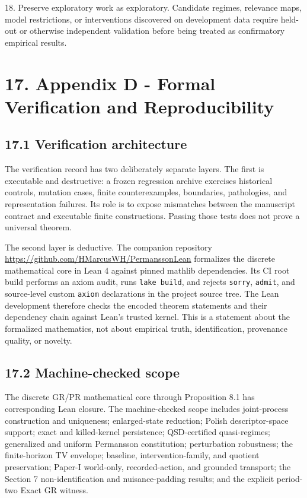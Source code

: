 \documentclass[10pt]{article}
\begin{document}
18. Preserve exploratory work as exploratory. Candidate regimes,
relevance maps, model restrictions, or interventions discovered on
development data require held-out or otherwise independent validation
before being treated as confirmatory empirical results.

\section{17. Appendix D - Formal Verification and Reproducibility}\label{appendix-d-formal-verification}

\subsection{17.1 Verification architecture}\label{verification-architecture}

The verification record has two deliberately separate layers. The first is executable and destructive: a frozen regression archive exercises historical controls, mutation cases, finite counterexamples, boundaries, pathologies, and representation failures. Its role is to expose mismatches between the manuscript contract and executable finite constructions. Passing those tests does not prove a universal theorem.

The second layer is deductive. The companion repository \url{https://github.com/HMarcusWH/PermanssonLean} formalizes the discrete mathematical core in Lean 4 against pinned mathlib dependencies. Its CI root build performs an axiom audit, runs \texttt{lake build}, and rejects \texttt{sorry}, \texttt{admit}, and source-level custom \texttt{axiom} declarations in the project source tree. The Lean development therefore checks the encoded theorem statements and their dependency chain against Lean's trusted kernel. This is a statement about the formalized mathematics, not about empirical truth, identification, provenance quality, or novelty.

\subsection{17.2 Machine-checked scope}\label{machine-checked-scope}

The discrete GR/PR mathematical core through Proposition 8.1 has corresponding Lean closure. The machine-checked scope includes joint-process construction and uniqueness; enlarged-state reduction; Polish descriptor-space support; exact and killed-kernel persistence; QSD-certified quasi-regimes; generalized and uniform Permansson constitution; perturbation robustness; the finite-horizon TV envelope; baseline, intervention-family, and quotient preservation; Paper-I world-only, recorded-action, and grounded transport; the Section 7 non-identification and nuisance-padding results; and the explicit period-two Exact GR witness.
\end{document}
